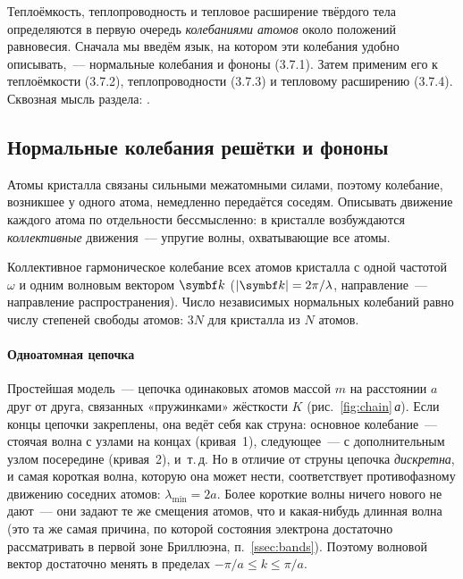 \begin{orientir}
Теплоёмкость, теплопроводность и тепловое расширение твёрдого тела
определяются в первую очередь \emph{колебаниями атомов} около положений
равновесия. Сначала мы введём язык, на котором эти колебания удобно
описывать,~— нормальные колебания и фононы (3.7.1). Затем применим его к
теплоёмкости (3.7.2), теплопроводности (3.7.3) и тепловому расширению
(3.7.4). Сквозная мысль раздела: .
\end{orientir}

\subsection{Нормальные колебания решётки и фононы}\label{ssec:phonons}

Атомы кристалла связаны сильными межатомными силами, поэтому колебание,
возникшее у одного атома, немедленно передаётся соседям. Описывать
движение каждого атома по отдельности бессмысленно: в кристалле
возбуждаются \emph{коллективные} движения~— упругие волны, охватывающие
все атомы.

\begin{opredelenie}
Коллективное гармоническое колебание всех атомов кристалла с одной
частотой $\omega$ и одним волновым вектором $\vb k$ ($|\vb k|=2\pi/\lambda$,
направление~— направление распространения). Число независимых нормальных
колебаний равно числу степеней свободы атомов: $3N$ для кристалла из $N$
атомов.
\end{opredelenie}

\paragraph{Одноатомная цепочка}
Простейшая модель~— цепочка одинаковых атомов массой $m$ на расстоянии $a$
друг от друга, связанных «пружинками» жёсткости $K$
(рис.~\ref{fig:chain}\,\textit{а}). Если концы цепочки закреплены, она
ведёт себя как струна: основное колебание~— стоячая волна с узлами на
концах (кривая~1), следующее~— с дополнительным узлом посередине
(кривая~2), и~т.\,д. Но в отличие от струны цепочка \emph{дискретна}, и
самая короткая волна, которую она может нести, соответствует
противофазному движению соседних атомов: $\lambda_{\min}=2a$. Более
короткие волны ничего нового не дают~— они задают те же смещения атомов,
что и какая-нибудь длинная волна (это та же самая причина, по которой
состояния электрона достаточно рассматривать в первой зоне Бриллюэна,
п.~\ref{ssec:bands}). Поэтому волновой вектор достаточно менять в пределах
$-\pi/a\le k\le\pi/a$.

